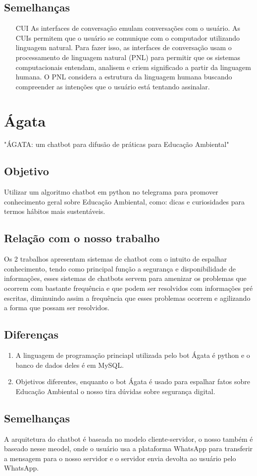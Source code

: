    \subsection{Semelhanças}
        \begin{enumerate}
            \item[CUI] 
                As interfaces de conversação emulam conversações com o usuário. As CUIs permitem que o usuário se comunique com o computador utilizando linguagem natural. Para fazer isso, as interfaces de conversação usam o processamento de linguagem natural (PNL) para permitir que os sistemas computacionais entendam, analisem e criem significado a partir da linguagem humana. O PNL considera a estrutura da linguagem humana buscando compreender as intenções que o usuário está tentando assinalar.
            
        \end{enumerate}

\section{Ágata}
    \begin{center}
        "ÁGATA: um chatbot para difusão de práticas para Educação Ambiental"
    \end{center}

    \subsection{Objetivo}
        Utilizar um algoritmo chatbot em python no telegrama para promover conhecimento geral sobre Educação Ambiental, como: dicas e curiosidades para termos hábitos mais sustentáveis.
    
    \subsection{Relação com o nosso trabalho}
        Os 2 trabalhos apresentam sistemas de chatbot com o intuito de espalhar conhecimento, tendo como principal função a segurança e disponibilidade de informações, esses sistemas de chatbots servem para amenizar os problemas que ocorrem com bastante frequência e que podem ser resolvidos com informações pré escritas, diminuindo assim a frequência que esses problemas ocorrem e agilizando a forma que possam ser resolvidos.
    
    \subsection{Diferenças}
        \begin{enumerate}
            \item 
                A linguagem de programação princiapl utilizada pelo bot Ágata é python e o banco de dados deles é em MySQL.
            \item 
                Objetivos diferentes, enquanto o bot Ágata é usado para espalhar fatos sobre Educação Ambiental o nosso tira dúvidas sobre segurança digital.
        \end{enumerate}
    
    \subsection{Semelhanças}
        A arquitetura do chatbot é baseada no modelo cliente-servidor, o nosso também é baseado nesse meodel, onde o usuário usa a plataforma WhatsApp para transferir a mensagem para o nosso servidor e o servidor envia devolta ao usuário pelo WhatsApp.